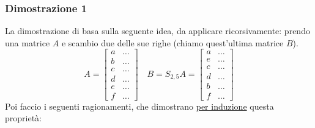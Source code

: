 \documentclass[12pt,a4paper,oneside]{article}
\begin{document}
\subsubsection*{Dimostrazione 1}
La dimostrazione di basa sulla seguente idea, da applicare ricorsivamente: prendo una matrice $ A $ e scambio due delle sue righe (chiamo quest'ultima matrice $ B $).
\[
	A=
	\begin{bmatrix}
		a & \ldots \\b& \ldots\\c& \ldots  \\d& \ldots\\e& \ldots\\f & \ldots
	\end{bmatrix}
	\quad
	B= S_{2 , 5}A=
	\begin{bmatrix}
		a & \ldots \\e& \ldots\\c& \ldots  \\d& \ldots\\b& \ldots\\f & \ldots
	\end{bmatrix}
\]
Poi faccio i seguenti ragionamenti, che dimostrano \underline{per induzione} questa proprietà:
\end{document}
